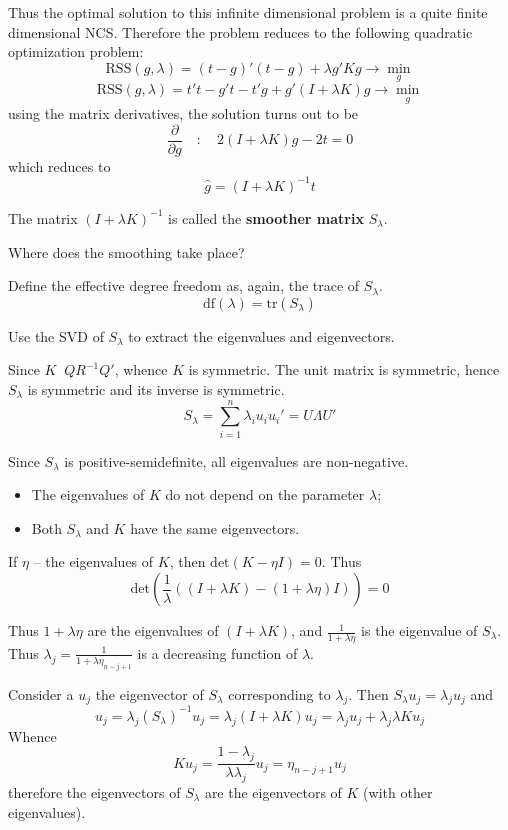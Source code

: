 \documentclass[a4paper]{article}
\newcommand{\brac}[1]{{\left ( #1 \right )}}
\newcommand{\RSS}{\text{RSS}}
\newcommand{\tr}{\text{tr}}
\newcommand{\defn}{\mathop{\overset{\Delta}{=}}\nolimits}
\begin{document}
Thus the optimal solution to this infinite dimensional problem is a quite finite dimensional NCS.
Therefore the problem reduces to the following quadratic optimization problem:
\[\RSS(g,\lambda) = {(t - g)}'{(t - g)} + \lambda g'K g \to \min_g\]
\[\RSS(g,\lambda) = t't - g't - t'g + g'( I + \lambda K )g  \to \min_g\]
using the matrix derivatives, the solution turns out to be
\[\frac{\partial}{\partial g} \quad:\quad 2( I + \lambda K )g - 2 t = 0\]
which reduces to
\[\hat{g} = \brac{I + \lambda K}^{-1} t\]

The matrix $\brac{I + \lambda K}^{-1}$ is called the \textbf{smoother matrix} $S_\lambda$.

Where does the smoothing take place? 

Define the effective degree freedom as, again, the trace of $S_\lambda$.
\[\text{df}(\lambda) = \tr\brac{S_\lambda}\]

Use the SVD of $S_\lambda$ to extract the eigenvalues and eigenvectors.

Since $K \defn Q R^{-1} Q'$, whence $K$ is symmetric. The unit matrix is symmetric, hence $S_\lambda$ is symmetric and its inverse is symmetric.
\[S_\lambda = \sum_{i=1}^n \lambda_i u_i u_i' = U\Lambda U'\]

Since  $S_\lambda$ is positive-semidefinite, all eigenvalues are non-negative.

\begin{itemize}
	\item The eigenvalues of $K$ do not depend on the parameter $\lambda$;
	\item Both $S_\lambda$ and $K$ have the same eigenvectors.
\end{itemize}

If $\eta$ -- the eigenvalues of $K$, then $\text{det}\brac{K-\eta I} = 0$.
Thus \[\text{det}\brac{\frac{1}{\lambda}\brac{\brac{I+\lambda K} -(1 + \lambda \eta) I} } = 0\]

Thus $1 + \lambda \eta$ are the eigenvalues of $\brac{I+\lambda K}$, and $\frac{1}{1 + \lambda \eta}$ is the eigenvalue of $S_\lambda$.
Thus $\lambda_j = \frac{1}{1+\lambda \eta_{n-j+1}}$ is a decreasing function of $\lambda$.

Consider a $u_j$ the eigenvector of $S_\lambda$ corresponding to $\lambda_j$.
Then $S_\lambda u_j = \lambda_j u_j$ and
\[u_j = \lambda_j \brac{S_\lambda}^{-1} u_j
= \lambda_j \brac{I+\lambda K} u_j
= \lambda_j u_j + \lambda_j \lambda K u_j\]
Whence
\[K u_j = \frac{1-\lambda_j}{\lambda \lambda_j} u_j = \eta_{n-j+1} u_j\]
therefore the eigenvectors of $S_\lambda$ are the eigenvectors of $K$ (with other eigenvalues).
\end{document}
